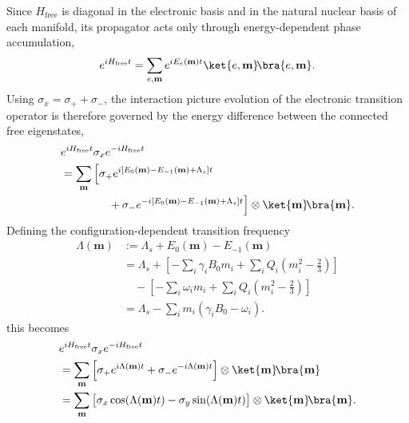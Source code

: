 Since \(H_{\mathrm{free}}\) is diagonal in the electronic basis and in the natural nuclear basis of each manifold, its propagator acts only through energy-dependent phase accumulation,
\[
e^{iH_{\mathrm{free}}t}
=
\sum_{e,\mathbf m}
e^{iE_e(\mathbf m)t}
\ket{e,\mathbf m}\!\bra{e,\mathbf m}.
\]
Using \(\sigma_x=\sigma_++\sigma_-\), the interaction picture evolution of the electronic transition operator is therefore governed by the energy difference between the connected free eigenstates,
\begin{equation}
\begin{aligned}
&e^{iH_{\mathrm{free}}t}
\sigma_x
e^{-iH_{\mathrm{free}}t}
\notag\\
&=
\sum_{\mathbf m}
\Big[
\sigma_+
e^{i[E_0(\mathbf m)-E_{-1}(\mathbf m)+\Lambda_s]t}
\\
&\hspace{1.5cm}
+
\sigma_-
e^{-i[E_0(\mathbf m)-E_{-1}(\mathbf m)+\Lambda_s]t}
\Big]
\otimes
\ket{\mathbf m}\!\bra{\mathbf m}.
\end{aligned}
\label{eq:sigmax_IP_phase}
\end{equation}
Defining the configuration-dependent transition frequency
\begin{equation}
\begin{aligned}
\Lambda(\mathbf m)
&:=
\Lambda_s
+
E_0(\mathbf m)
-
E_{-1}(\mathbf m)
\\
&=
\Lambda_s
+
\left[
-\sum_i\gamma_iB_0m_i
+
\sum_iQ_i\!\left(m_i^2-\tfrac23\right)
\right]
\\
&\quad
-
\left[
-\sum_i\omega_i m_i
+
\sum_iQ_i\!\left(m_i^2-\tfrac23\right)
\right]
\\
&=
\Lambda_s
-
\sum_i m_i(\gamma_iB_0-\omega_i).
\end{aligned}
\label{eq:Lambda_config_general}
\end{equation}
this becomes
\begin{equation}
\begin{aligned}
&e^{iH_{\mathrm{free}}t}
\sigma_x
e^{-iH_{\mathrm{free}}t}
\notag\\
&=
\sum_{\mathbf m}
\left[
\sigma_+ e^{i\Lambda(\mathbf m)t}
+
\sigma_- e^{-i\Lambda(\mathbf m)t}
\right]
\otimes
\ket{\mathbf m}\!\bra{\mathbf m}
\\
&=
\sum_{\mathbf m}
\big[
\sigma_x\cos(\Lambda(\mathbf m)t)
-
\sigma_y\sin(\Lambda(\mathbf m)t)
\big]
\otimes
\ket{\mathbf m}\!\bra{\mathbf m}.
\end{aligned}
\label{eq:sigmax_IP_step}
\end{equation}




